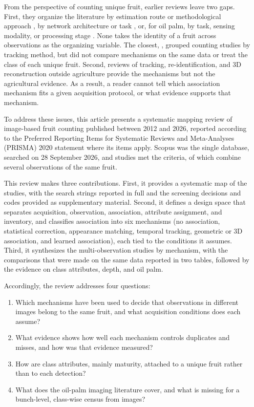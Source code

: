 From the perspective of counting unique fruit, earlier reviews leave two gaps. First, they organize the literature by estimation route or methodological approach \citep{anderson2021technologies,barriguinha2021vineyard,magro2023computational,rong2026research}, by network architecture or task \citep{maheswari2021intelligent,mohimont2022computer}, or, for oil palm, by task, sensing modality, or processing stage \citep{khan2021oil,lai2023oil,kamal2024machine}. None takes the identity of a fruit across observations as the organizing variable. The closest, \citet{miranda2023fruit}, grouped counting studies by tracking method, but did not compare mechanisms on the same data or treat the class of each unique fruit. Second, reviews of tracking, re-identification, and 3D reconstruction outside agriculture provide the mechanisms but not the agricultural evidence. As a result, a reader cannot tell which association mechanism fits a given acquisition protocol, or what evidence supports that mechanism.

To address these issues, this article presents a systematic mapping review of image-based fruit counting published between 2012 and 2026, reported according to the Preferred Reporting Items for Systematic Reviews and Meta-Analyses (PRISMA) 2020 statement where its items apply. Scopus was the single database, searched on 28 September 2026, and \nIncluded studies met the criteria, of which \nMulti combine several observations of the same fruit.

This review makes three contributions. First, it provides a systematic map of the \nIncluded studies, with the search strings reported in full and the screening decisions and codes provided as supplementary material. Second, it defines a design space that separates acquisition, observation, association, attribute assignment, and inventory, and classifies association into six mechanisms (no association, statistical correction, appearance matching, temporal tracking, geometric or 3D association, and learned association), each tied to the conditions it assumes. Third, it synthesizes the \nMulti multi-observation studies by mechanism, with the comparisons that were made on the same data reported in two tables, followed by the evidence on class attributes, depth, and oil palm.

Accordingly, the review addresses four questions:
\begin{enumerate}[label=(\arabic*),leftmargin=*]
\item Which mechanisms have been used to decide that observations in different images belong to the same fruit, and what acquisition conditions does each assume?
\item What evidence shows how well each mechanism controls duplicates and misses, and how was that evidence measured?
\item How are class attributes, mainly maturity, attached to a unique fruit rather than to each detection?
\item What does the oil-palm imaging literature cover, and what is missing for a bunch-level, class-wise census from images?
\end{enumerate}

